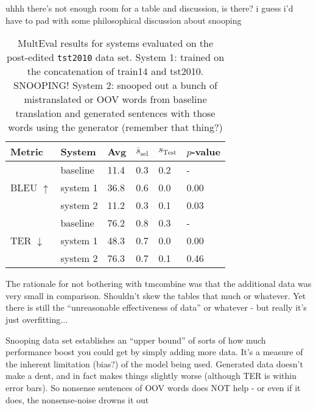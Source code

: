 {uhhh there's not enough room for a table and discussion, is there? i guess i'd have to pad with some philosophical discussion about snooping


\begin{table}[htb]
\begin{center}
\begin{tabular}{|l|l|l|l|l|l|}
\hline
\bf Metric & \bf System & \bf Avg & \bf $\overline{s}_{\text{sel}}$ & \bf $s_{\text{Test}}$ & \bf $p$-value \\
\hline
\multirow{3}{*}{BLEU $\uparrow$}
& baseline & 11.4 & 0.3 & 0.2 & - \\
& system 1 & 36.8 & 0.6 & 0.0 & 0.00 \\
& system 2 & 11.2 & 0.3 & 0.1 & 0.03 \\
\hline
\multirow{3}{*}{TER $\downarrow$}
& baseline & 76.2 & 0.8 & 0.3 & - \\
& system 1 & 48.3 & 0.7 & 0.0 & 0.00 \\
& system 2 & 76.3 & 0.7 & 0.1 & 0.46 \\
\hline
\end{tabular}
\end{center}

\caption{\label{tab:multeval_tst2010-fixed} %
MultEval results for systems evaluated on the post-edited {\small \tt tst2010} data set.
System 1: trained on the concatenation of train14 and tst2010. SNOOPING!
System 2: snooped out a bunch of mistranslated or OOV words from baseline translation and generated sentences with those words using the generator (remember that thing?)
} %
\end{table}

The rationale for not bothering with tmcombine was that the additional data was very small in comparison.
Shouldn't skew the tables that much or whatever.
Yet there is still the ``unreasonable effectiveness of data'' or whatever - but really it's just overfitting...

Snooping data set establishes an ``upper bound'' of sorts of how much performance boost you could get by simply adding more data.
It's a measure of the inherent limitation (bias?) of the model being used.
Generated data doesn't make a dent, and in fact makes things slightly worse (although TER is within error bars).
So nonsense sentences of OOV words does NOT help - or even if it does, the nonsense-noise drowns it out

} %







